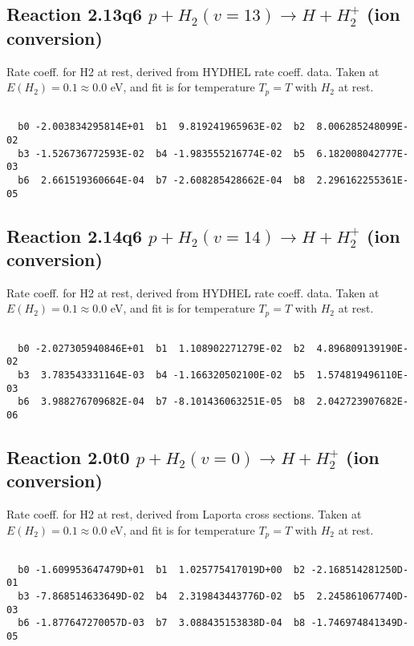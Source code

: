 \documentclass[12pt,dvipdfmx]{article}
\begin{document}
\subsection{
Reaction 2.13q6
$ p + H_2(v=13) \rightarrow H + H_2^+$ (ion conversion)
}
Rate coeff. for H2 at rest, derived from HYDHEL rate coeff. data.
Taken at $E(H_2) = 0.1 \approx 0.0$ eV,  and fit is for temperature $T_p=T$ with $H_2$ at rest.

\begin{small}\begin{verbatim}

  b0 -2.003834295814E+01  b1  9.819241965963E-02  b2  8.006285248099E-02
  b3 -1.526736772593E-02  b4 -1.983555216774E-02  b5  6.182008042777E-03
  b6  2.661519360664E-04  b7 -2.608285428662E-04  b8  2.296162255361E-05

\end{verbatim}\end{small}

\newpage
\subsection{
Reaction 2.14q6
$ p + H_2(v=14) \rightarrow H + H_2^+$ (ion conversion)
}
Rate coeff. for H2 at rest, derived from HYDHEL rate coeff. data.
Taken at $E(H_2) = 0.1 \approx 0.0$ eV,  and fit is for temperature $T_p=T$ with $H_2$ at rest.

\begin{small}\begin{verbatim}

  b0 -2.027305940846E+01  b1  1.108902271279E-02  b2  4.896809139190E-02
  b3  3.783543331164E-03  b4 -1.166320502100E-02  b5  1.574819496110E-03
  b6  3.988276709682E-04  b7 -8.101436063251E-05  b8  2.042723907682E-06

\end{verbatim}\end{small}

\newpage
\subsection{
Reaction 2.0t0
$ p + H_2(v=0) \rightarrow H + H_2^+$ (ion conversion)
}
Rate coeff. for H2 at rest, derived from Laporta cross sections.
Taken at $E(H_2) = 0.1 \approx 0.0$ eV,  and fit is for temperature $T_p=T$ with $H_2$ at rest.

\begin{small}\begin{verbatim}

  b0 -1.609953647479D+01  b1  1.025775417019D+00  b2 -2.168514281250D-01
  b3 -7.868514633649D-02  b4  2.319843443776D-02  b5  2.245861067740D-03
  b6 -1.877647270057D-03  b7  3.088435153838D-04  b8 -1.746974841349D-05

\end{verbatim}\end{small}
\end{document}
